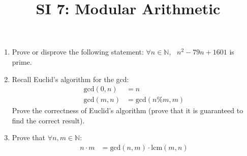 \documentclass[12pt]{article}
\date{}
\author{}
\title{SI 7: Modular Arithmetic}
\begin{document}
	\maketitle
	\begin{enumerate}
		\item Prove or disprove the following statement:
		$\forall n \in \mathbb{N},\:\:\: n^2-79n+1601$ is prime.
		\item Recall Euclid's algorithm for the gcd:
		\begin{align*}
			\text{gcd}(0,n) &= n\\
			\text{gcd}(m,n) &= \text{gcd}(n\%m,m)
		\end{align*}
		Prove the correctness of Euclid's algorithm (prove that it is guaranteed to find the correct result).
		\item Prove that $\forall n,m\in\mathbb{N}$:
		\begin{align*}
		n\cdot m &=\text{gcd}(n,m) \cdot \text{lcm}(m,n)
		\end{align*}
	\end{enumerate}
\end{document}
